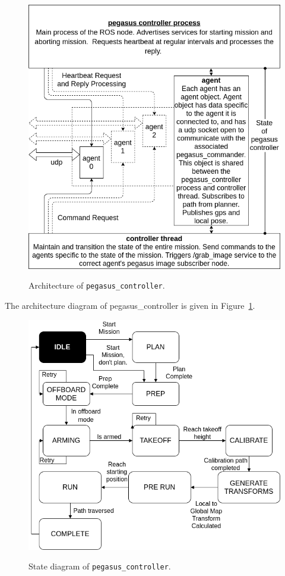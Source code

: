 \begin{figure}
	\centering
	\caption[Architecture of \texttt{pegasus\_controller}.]{\small Architecture of \texttt{pegasus\_controller}.}
	\includegraphics[width=5in]{figures/methodology/methodology-pegasus-controller}
	\label{fig:pegasus-controller}
\end{figure}

The architecture diagram of pegasus\_controller is given in Figure~\ref{fig:pegasus-controller}.
\begin{figure}
	\centering
	\caption[State diagram of \texttt{pegasus\_controller}.]{\small State diagram of \texttt{pegasus\_controller}.}
	\includegraphics[width=5in]{figures/methodology/methodology-controller-state-diagram}
	\label{fig:controller-state-diagram}
\end{figure}

